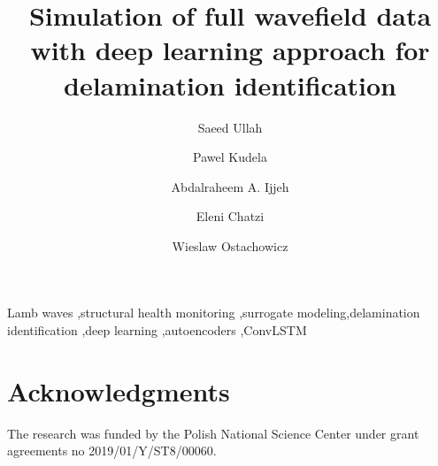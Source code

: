 \documentclass[preprint,9pt]{elsarticle}
\begin{document}
	\begin{frontmatter}
		\title{Simulation of full wavefield data with deep learning approach for delamination identification}
		
		\address[IFFM]{Institute of Fluid Flow Machinery, Polish Academy of 
		Sciences, Poland}
		\address[ETH]{Department of Civil, Environmental, and Geomatic Engineering, ETH Z\"{u}rich, Switzerland}
		\author{Saeed Ullah}
		\author{Pawel Kudela}
		\author{Abdalraheem A. Ijjeh}
		\author{Eleni Chatzi }
		\author{Wieslaw Ostachowicz }	
		
		\begin{abstract}
			
		\end{abstract}
		
		\begin{keyword}
			Lamb waves \sep structural health monitoring \sep surrogate 
			modeling\sep delamination identification \sep deep learning 
			\sep  autoencoders \sep ConvLSTM 
			
			
		\end{keyword}
	\end{frontmatter}
	
	
	
	
	
	\clearpage
	
	
	\clearpage	
	\section*{Acknowledgments}
	The research was funded by the Polish National Science Center under grant agreements no 2019/01/Y/ST8/00060.
	
	
\end{document}
